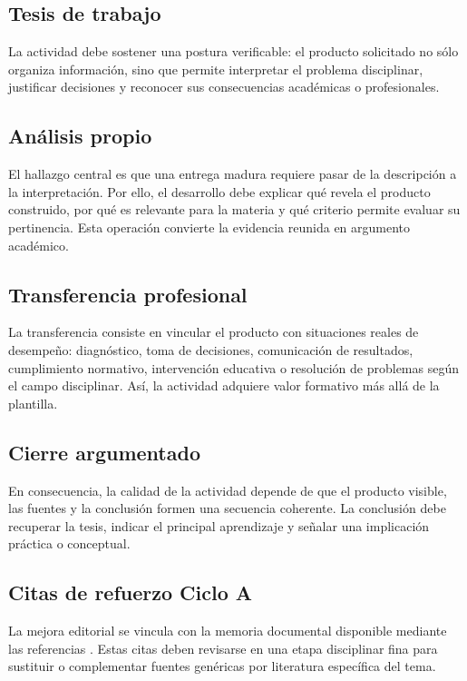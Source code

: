 \documentclass[12pt]{article}
\begin{document}
\subsection*{Tesis de trabajo}
La actividad debe sostener una postura verificable: el producto solicitado no sólo organiza información, sino que permite interpretar el problema disciplinar, justificar decisiones y reconocer sus consecuencias académicas o profesionales.

\subsection*{Análisis propio}
El hallazgo central es que una entrega madura requiere pasar de la descripción a la interpretación. Por ello, el desarrollo debe explicar qué revela el producto construido, por qué es relevante para la materia y qué criterio permite evaluar su pertinencia. Esta operación convierte la evidencia reunida en argumento académico.

\subsection*{Transferencia profesional}
La transferencia consiste en vincular el producto con situaciones reales de desempeño: diagnóstico, toma de decisiones, comunicación de resultados, cumplimiento normativo, intervención educativa o resolución de problemas según el campo disciplinar. Así, la actividad adquiere valor formativo más allá de la plantilla.

\subsection*{Cierre argumentado}
En consecuencia, la calidad de la actividad depende de que el producto visible, las fuentes y la conclusión formen una secuencia coherente. La conclusión debe recuperar la tesis, indicar el principal aprendizaje y señalar una implicación práctica o conceptual.



\subsection*{Citas de refuerzo Ciclo A}
La mejora editorial se vincula con la memoria documental disponible mediante las referencias \cite{cicloARefuerzo01,cicloARefuerzo02,cicloARefuerzo03,cicloARefuerzo04,cicloARefuerzo05,cicloARefuerzo06}. Estas citas deben revisarse en una etapa disciplinar fina para sustituir o complementar fuentes genéricas por literatura específica del tema.
\end{document}
